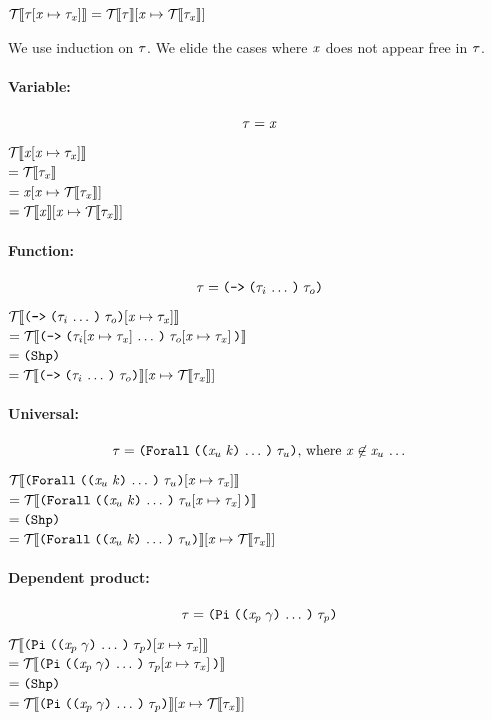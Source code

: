 \newcommand{\etypesubst}[1]{\subst{#1}{\var}{\EraseT{\type_\var}}}
\begin{lemma}%
  \label{TTSubstErase}
  $\EraseT{\typesubst{\type}} = \etypesubst{\EraseT{\type}}$
\end{lemma}
\begin{sproof}
  We use induction on $\mathit{\tau}$.
  We elide the cases where $\mathit{x}$ does not appear free in $\mathit{\tau}$.
  \paragraph{Variable:}
  \[\mathit{\tau} = \mathit{x}\]
  $\mathcal{T}{\hskip-.25em}\left\llbracket \mathit{x}\hspace{-2pt}\left[ \mathit{x} \mapsto \mathit{\tau}_{\mathit{x}} \right] \right\rrbracket$ \\
  $= \mathcal{T}{\hskip-.25em}\left\llbracket \mathit{\tau}_{\mathit{x}} \right\rrbracket$ \\
  $= \etypesubst{\var}$ \\
  $= \etypesubst{\EraseT{\var}}$ \\

  \paragraph{Function:}
  \[\type = \typefun{\sequence{\type_i}}{\type_o}\]
  $\EraseT{\typesubst{\typefun{\sequence{\type_i}}{\type_o}}}$ \\
  $= \EraseT{\typefun{\sequence{\typesubst{\type_i}}}{\typesubst{\type_o}}}$ \\
  $= \idxshape{}$ \\
  $= \etypesubst{\EraseT{\typefun{\sequence{\type_i}}{\type_o}}}$ \\

  \paragraph{Universal:}
  \[\type = \typeuniv{\sequence{\notevar{\var_u}{\kind}}}{\type_u}\text{, where }\var \not\in \sequence{\var_u}\]
  $\EraseT{\typesubst{\typeuniv{\sequence{\notevar{\var_u}{\kind}}}{\type_u}}}$ \\
  $= \EraseT{\typeuniv{\sequence{\notevar{\var_u}{\kind}}}{\typesubst{\type_u}}}$ \\
  $= \idxshape{}$ \\
  $= \etypesubst{\EraseT{\typeuniv{\sequence{\notevar{\var_u}{\kind}}}{\type_u}}}$

  \paragraph{Dependent product:}
  \[\type = \typedprod{\sequence{\notevar{\var_p}{\sort}}}{\type_p}\]
  $\EraseT{\typesubst{\typedprod{\sequence{\notevar{\var_p}{\sort}}}{\type_p}}}$ \\
  $= \EraseT{\typedprod{\sequence{\notevar{\var_p}{\sort}}}{\typesubst{\type_p}}}$ \\
  $= \idxshape{}$ \\
  $= \etypesubst{\EraseT{\typedprod{\sequence{\notevar{\var_p}{\sort}}}{\type_p}}}$ \\


\end{sproof}
